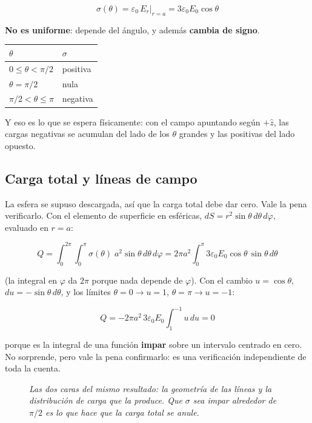 \documentclass[12pt,a4paper]{article}
\begin{document}
\[
\boxed{\;\sigma(\theta) = \varepsilon_0\,E_r\big|_{r=a} = 3\varepsilon_0 E_0\cos\theta\;}
\]

\textbf{No es uniforme}: depende del ángulo, y además \textbf{cambia de signo}.

\begin{table}[H]
  \centering
  \begin{tabular}{@{}ll@{}}
    \toprule
    $\theta$ & $\sigma$ \\
    \midrule
    $0 \le \theta < \pi/2$   & positiva \\
    $\theta = \pi/2$         & nula \\
    $\pi/2 < \theta \le \pi$ & negativa \\
    \bottomrule
  \end{tabular}
\end{table}

Y eso es lo que se espera físicamente: con el campo apuntando según $+\hat z$, las
cargas negativas se acumulan del lado de los $\theta$ grandes y las positivas del
lado opuesto.

\subsection{Carga total y líneas de campo}

La esfera se supuso descargada, así que la carga total debe dar cero. Vale la pena
verificarlo. Con el elemento de superficie en esféricas,
$dS = r^2\sin\theta\,d\theta\,d\varphi$, evaluado en $r=a$:

\[
Q = \int_0^{2\pi}\!\!\int_0^{\pi} \sigma(\theta)\;a^2\sin\theta\,d\theta\,d\varphi
= 2\pi a^2\int_0^{\pi} 3\varepsilon_0 E_0\cos\theta\,\sin\theta\,d\theta
\]

(la integral en $\varphi$ da $2\pi$ porque nada depende de $\varphi$). Con el
cambio $u = \cos\theta$, $du = -\sin\theta\,d\theta$, y los límites
$\theta=0\to u=1$, $\theta=\pi\to u=-1$:

\[
Q = -2\pi a^2\,3\varepsilon_0 E_0\int_{1}^{-1} u\,du = 0
\]

porque es la integral de una función \textbf{impar} sobre un intervalo centrado en
cero. No sorprende, pero vale la pena confirmarlo: es una verificación
independiente de toda la cuenta.

\begin{figure}[H]
  \centering
  
  \caption*{\small\itshape Las dos caras del mismo resultado: la geometría de las
  líneas y la distribución de carga que la produce. Que $\sigma$ sea impar
  alrededor de $\pi/2$ es lo que hace que la carga total se anule.}
\end{figure}
\end{document}
